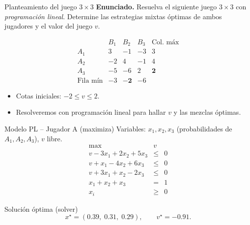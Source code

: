 \documentclass{beamer}
\begin{document}
\begin{frame}{Planteamiento del juego \(3\times3\)}
\textbf{Enunciado.}\;
Resuelva el siguiente juego \(3\times3\) con \emph{programación lineal}.  
Determine las estrategias mixtas óptimas de ambos jugadores y el valor del juego \(v\).

\[
\renewcommand{\arraystretch}{1.15}
\begin{array}{c|ccc|c}
      &  B_1 &   B_2 &   B_3 & \text{Col.\ máx} \\\hline
A_1 &   3    &  -1   &  -3   & 3\\
A_2 &  -2    &   4   &  -1   & 4\\
A_3 &  -5    &  -6   &   2   &  \mathbf{2}\\\hline
\text{Fila mín} & -3 & \mathbf{-2} & -6
\end{array}
\]
\begin{itemize}[<+->]
  \item Cotas iniciales: \(\boxed{-2\le v\le 2}\).
  \item Resolveremos con programación lineal para hallar \(v\) y las mezclas óptimas.
\end{itemize}
\end{frame}

\begin{frame}{Modelo PL – Jugador A (maximiza)}
\small
Variables: \(x_1,x_2,x_3\) (probabilidades de \(A_1,A_2,A_3\)), \(v\) libre.
\[
\renewcommand{\arraystretch}{1.15}
\begin{array}{rcl}
\max & v & \\ \hline
v - 3x_1 + 2x_2 + 5x_3 &\le& 0\\
v +  x_1 - 4x_2 + 6x_3 &\le& 0\\
v + 3x_1 +  x_2 - 2x_3 &\le& 0\\
x_1 + x_2 + x_3 &=& 1\\
x_i &\ge& 0
\end{array}
\]
\begin{block}{Solución óptima (solver)}
\[
x^\star=(0.39,\;0.31,\;0.29),\qquad v^\star=-0.91.
\]
\end{block}
\end{frame}
\end{document}
